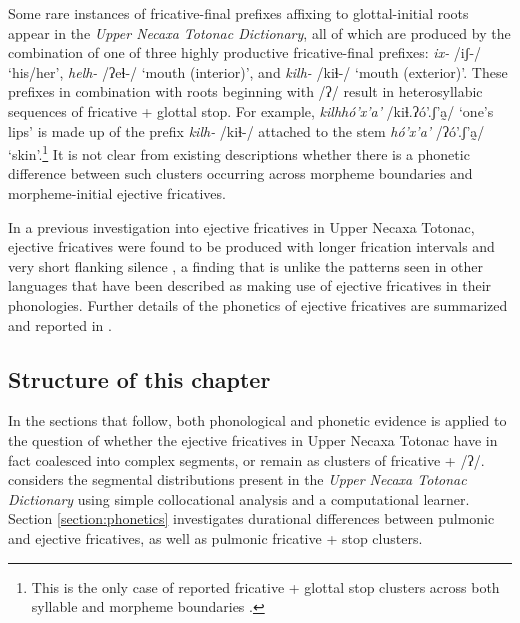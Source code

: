 \documentclass[output=paper,colorlinks,citecolor=brown]{langscibook}
\begin{document}
\newpage
Some rare instances of fricative-final prefixes affixing to glottal-initial roots appear in the \textit{Upper Necaxa Totonac Dictionary}, all of which are produced by the combination of one of three highly productive fricative-final prefixes: \textit{ix-} {/iʃ-/} `his/her', \textit{helh-} {/ʔe{ɬ}-/} `mouth (interior)', and \textit{kilh-} {/ki{ɬ}-/} `mouth (exterior)'. These prefixes in combination with roots beginning with /ʔ/ result in heterosyllabic sequences of fricative + glottal stop. For example, \textit{kilhhó'x'a'} {/ki{ɬ}.ʔó'.ʃ'a̰/} `one's lips' is made up of the prefix \textit{kilh-} {/ki{ɬ}-/} attached to the stem \textit{hó'x'a'} {/ʔó'.ʃ'a̰/} `skin'.\footnote{This is the only case of reported fricative + glottal stop clusters across both syllable and morpheme boundaries \citep{Beck2006}.} It is not clear from existing descriptions whether there is a phonetic difference between such clusters occurring across morpheme boundaries and morpheme-initial ejective fricatives.

In a previous investigation into ejective fricatives in Upper Necaxa Totonac, ejective fricatives were found to be produced with longer frication intervals and very short flanking silence \citep{Beck2006}, a finding that is unlike the patterns seen in other languages that have been described as making use of ejective fricatives in their phonologies. Further details of the phonetics of ejective fricatives are summarized and reported in .  

\subsection{Structure of this chapter}
In the sections that follow, both phonological and phonetic evidence is applied to the question of whether the ejective fricatives in Upper Necaxa Totonac have in fact coalesced into complex segments, or remain as clusters of fricative + /ʔ/.  considers the segmental distributions present in the \textit{Upper Necaxa Totonac Dictionary} using simple collocational analysis and a computational learner. Section \ref{section:phonetics} investigates durational differences between pulmonic and ejective fricatives, as well as pulmonic fricative + stop clusters.
\end{document}
